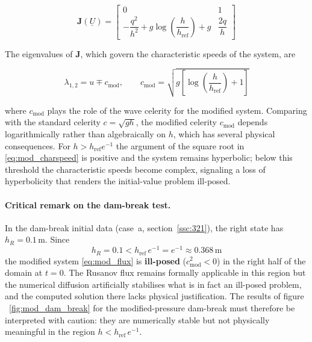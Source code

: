 \begin{equation}
\mathbf{J}(\underline{U}) =
\begin{bmatrix}
0 & 1 \\
-\dfrac{q^2}{h^2} + g\log\left(\dfrac{h}{h_{\mathrm{ref}}}\right) + g & \dfrac{2q}{h}
\end{bmatrix}
\label{eq:mod_jacobian}
\end{equation}

The eigenvalues of \( \mathbf{J} \), which govern the characteristic speeds of the system, are

\begin{equation}
\lambda_{1,2} = u \mp c_{\mathrm{mod}}, \qquad c_{\mathrm{mod}} = \sqrt{g\left[\log\left(\frac{h}{h_{\mathrm{ref}}}\right) + 1\right]}
\label{eq:mod_charspeed}
\end{equation}

where \( c_{\mathrm{mod}} \) plays the role of the wave celerity for the modified system. Comparing with the standard celerity \( c = \sqrt{gh} \), the modified celerity \( c_{\mathrm{mod}} \) depends logarithmically rather than algebraically on \( h \), which has several physical consequences. For \( h > h_{\mathrm{ref}}  e^{-1} \) the argument of the square root in \eqref{eq:mod_charspeed} is positive and the system remains hyperbolic; below this threshold the characteristic speeds become complex, signaling a loss of hyperbolicity that renders the initial-value problem ill-posed.

\paragraph{Critical remark on the dam-break test.}
In the dam-break initial data (case~a, section~\ref{ssc:321}), 
the right state has $h_R = 0.1\,\mathrm{m}$. Since
%
\begin{equation}
    h_R = 0.1 < h_{\mathrm{ref}}\,e^{-1} = e^{-1} \approx 0.368\,\mathrm{m}
    \label{eq:hyp_threshold}
\end{equation}
%
the modified system \eqref{eq:mod_flux} is \textbf{ill-posed} 
($c_{\mathrm{mod}}^2 < 0$) in the right half of the domain at 
$t = 0$. The Rusanov flux remains formally applicable in this 
region but the numerical diffusion  artificially stabilises what is in fact an ill-posed problem, and the computed solution there lacks physical justification. The results of figure ~\ref{fig:mod_dam_break} for the modified-pressure dam-break must therefore be interpreted with  caution: they are numerically stable but not physically meaningful in the region $h < h_{\mathrm{ref}}\,e^{-1}$.


